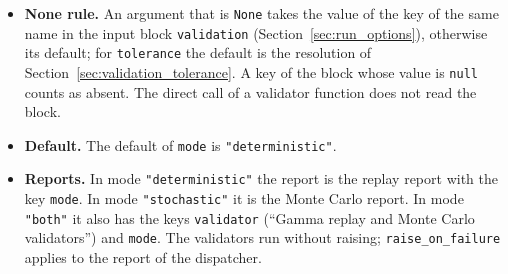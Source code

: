 \tabend

\begin{itemize}[nosep]
  \item \textbf{None rule.} An argument that is \texttt{None} takes the value of the key of the same name in the input block \texttt{validation} (Section~\ref{sec:run_options}), otherwise its default; for \texttt{tolerance} the default is the resolution of Section~\ref{sec:validation_tolerance}. A key of the block whose value is \texttt{null} counts as absent. The direct call of a validator function does not read the block.
  \item \textbf{Default.} The default of \texttt{mode} is \texttt{"deterministic"}.
  \item \textbf{Reports.} In mode \texttt{"deterministic"} the report is the replay report with the key \texttt{mode}. In mode \texttt{"stochastic"} it is the Monte Carlo report. In mode \texttt{"both"} it also has the keys \texttt{validator} (``Gamma replay and Monte Carlo validators'') and \texttt{mode}. The validators run without raising; \texttt{raise\_on\_failure} applies to the report of the dispatcher.
\end{itemize}

\tabend

